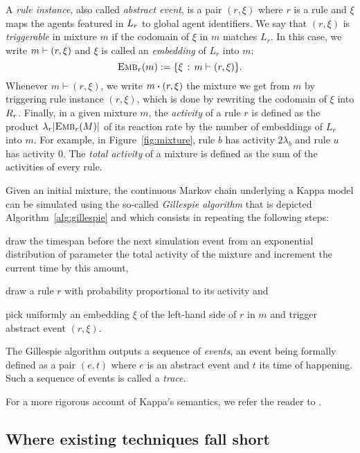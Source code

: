 A \emph{rule instance}, also called \emph{abstract event}, is a pair
$(r, \xi)$ where $r$ is a rule and $\xi$ maps the agents featured in
$L_{r}$ to global agent identifiers. We say that $(r, \xi)$ is
\emph{triggerable} in mixture $m$ if the codomain of $\xi$ in $m$
matches $L_r$. In this case, we write $m \vdash (r, \xi)$ and
$\xi$ is called an \emph{embedding} of $L_r$ into $m$:
\[{\textsc{Emb}}_{r}(m) := \{ \xi \,:\, m \vdash (r, \xi)\}.\]
Whenever $m \vdash (r, \xi)$, we write $\UPDATE{m}{(r, \xi)}$ the
mixture we get from $m$ by triggering rule instance $(r, \xi)$, which
is done by rewriting the codomain of $\xi$ into $R_{r}$.  Finally,
in a given mixture $m$, the \emph{activity} of a rule $r$ is defined
as the product $\lambda_r|{\textsc{Emb}}_{r}(M)|$ of its reaction rate by the
number of embeddings of $L_r$ into $m$. For example, in
Figure~\ref{fig:mixture}, rule $b$ has activity $2\lambda_b$ and rule
$u$ has activity $0$. The \emph{total activity} of a mixture is
defined as the sum of the activities of every rule.

Given an initial mixture, the continuous Markov chain underlying a
Kappa model can be simulated using the so-called \emph{Gillespie
  algorithm} \cite{DanosEtAl-APLAS07} that is depicted
Algorithm~\ref{alg:gillespie} and which consists in repeating the
following steps:
\begin{inparaenum}[(1)]
\item draw the timespan before the next simulation event from an
  exponential distribution of parameter the total activity of the
  mixture and increment the current time by this amount,
\item draw a rule $r$ with probability proportional to its activity
  and
\item pick uniformly an embedding $\xi$ of the left-hand side of $r$
  in $m$ and trigger abstract event $(r, \xi)$.
\end{inparaenum}
The Gillespie algorithm outputs a sequence of \emph{events}, an event
being formally defined as a pair $(e, t)$ where $e$ is an abstract
event and $t$ its time of happening. Such a sequence of events is
called a \emph{trace}.



\noindent For a more rigorous account of Kappa's semantics, we refer
the reader to \cite{}.



\subsection{Where existing techniques fall short}

